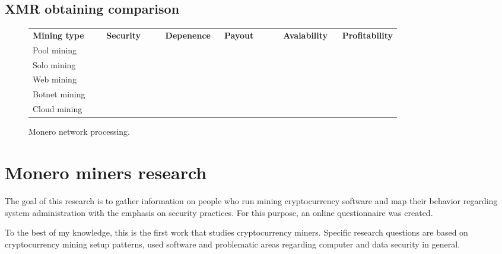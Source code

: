 \documentclass[
  printed, %
  table,   %
  nolof,     %
  nolot,     %
           oneside, color
]{fithesis3}
\begin{document}
\section{XMR obtaining comparison}
\begin{figure}[H]
\center
\begin{tabular}{p{0.2\linewidth}p{0.16\linewidth}p{0.16\linewidth}p{0.16\linewidth}p{0.16\linewidth}p{0.16\linewidth}}
\textbf{Mining type} & \textbf{Security} & \textbf{Depenence} & \textbf{Payout} & \textbf{Avaiability} & \textbf{Profitability} \\
Pool mining          &                   &                    &                 &                      &                        \\
Solo mining          &                   &                    &                 &                      &                        \\
Web mining           &                   &                    &                 &                      &                        \\
Botnet mining        &                   &                    &                 &                      &                        \\
Cloud mining         &                   &                    &                 &                      &                       
\end{tabular}
\caption{Monero network processing.}
\label{pict:network-processing}
\end{figure}
\fi
\chapter{Monero miners research}
The goal of this research is to gather information on people who run mining cryptocurrency software and map their behavior regarding system administration with the emphasis on security practices. For this purpose, an online questionnaire was created. 

To the best of my knowledge, this is the first work that studies cryptocurrency miners. Specific research questions are based on cryptocurrency mining setup patterns, used software and problematic areas regarding computer and data security in general. 
\end{document}
